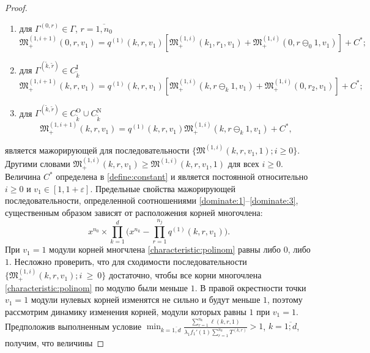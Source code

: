 \documentclass[a4paper,twoside]{article}
\theoremstyle{theorem}
\theoremstyle{remark}
\begin{document}
\begin{proof}
\begin{enumerate}[ 1{)} ]
\item для $ \Gamma^{(0,r)} \in \Gamma$, $r = \overline{1,n_0}$ 
\begin{equation}
\mathfrak{M}_+^{(1,i+1)}(0,r,v_1) = q^{(1)}(k,r,v_1)
[\mathfrak{M}_+^{(1,i)}(k_1, r_1,v_1) +\mathfrak{M}_+^{(1,i)}(0, r\ominus_0 1,v_1) ] + C^*;
\label{dominate:1}
\end{equation}
\item для $\Gamma^{(\tilde{k},\tilde{r})} \in C_{\tilde{k}}^{\mathrm{I}}$
\begin{equation}
 \mathfrak{M}_+^{(1,i+1)}(k,r,v_1) = q^{(1)}(k,r,v_1) [ \mathfrak{M}_+^{(1,i)}(k,r\ominus_{k}1,v_1) +\mathfrak{M}_+^{(1,i)}(0,r_2,v_1) ]+ C^*;
 \label{dominate:2}
\end{equation}
\item для $\Gamma^{(\tilde{k},\tilde{r})} \in C_{\tilde{k}}^{\mathrm{O}} \cup C_{\tilde{k}}^{\mathrm{N}}$
\begin{equation}
\mathfrak{M}_+^{(1,i+1)}(k,r,v_1) = q^{(1)}(k,r,v_1) \mathfrak{M}_+^{(1,i)}(k,r\ominus_k 1,v_1) + C^*,
\label{dominate:3}
\end{equation}
\end{enumerate}
является мажорирующей для последовательности $\{\mathfrak{M}^{(1,i)}(k,r,v_1,1); i\geqslant 0\}$. Другими словами $ \mathfrak{M}_+^{(1,i)}(k,r,v_1)\geqslant \mathfrak{M}^{(1,i)}(k,r,v_1,1)$ для всех $i\geqslant 0$. Величина $C^*$ определена в \eqref{define:constant} и является постоянной относительно $i\geqslant 0$ и $v_1\in [1,1+\varepsilon]$. Предельные свойства мажорирующей последовательности, определенной соотношениями \eqref{dominate:1}--\eqref{dominate:3}, существенным образом зависят от расположения корней многочлена:
\begin{equation}
x^{n_0} \times \prod_{k=1}^{d} \big(x^{n_k} - \prod_{r=1}^{n_j}q^{(1)}(k,r,v_1)\big).
\label{characteristic:polinom}
\end{equation}
При $v_1=1$ модули корней многчлена \eqref{characteristic:polinom} равны либо $0$, либо $1$. Несложно проверить, что для сходимости последовательности $\{\mathfrak{M}_+^{(1,i)}(k,r,v_1); {i~\geqslant~0}\}$ достаточно, чтобы все корни многочлена \eqref{characteristic:polinom} по модулю были меньше $1$. В правой окрестности точки $v_1=1$ модули нулевых корней изменятся не сильно и будут меньше $1$, поэтому рассмотрим динамику изменения корней, модули которых равны $1$ при $v_1=1$.
Предположив выполненным условие $\min_{k=\overline{1,d}} { \frac{\sum_{r = 1}^{n_k} \ell(k,r,1) }{\lambda_1 f_1'(1) \sum_{r=1}^{n_k} T^{(k,r)} }}>1$, $k=\overline{1;d}$, получим, что величины

\end{proof}
\end{document}
